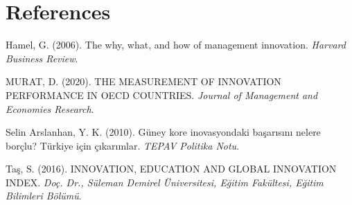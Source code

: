 \documentclass[
  12pt,
]{article}
\newlength{\cslhangindent}
\newlength{\cslentryspacingunit} %
\newenvironment{CSLReferences}[2] %
 {%
  \setlength{\parindent}{0pt}
  \ifodd #1
  \let\oldpar\par
  \def\par{\hangindent=\cslhangindent\oldpar}
  \fi
  \setlength{\parskip}{#2\cslentryspacingunit}
 }%
 {}
\begin{document}
\newpage

\hypertarget{references}{%
\section{References}\label{references}}

\hypertarget{refs}{}
\begin{CSLReferences}{1}{0}
\leavevmode{}%
Hamel, G. (2006). The why, what, and how of management innovation. \emph{Harvard Business Review}.

\leavevmode{}%
MURAT, D. (2020). THE MEASUREMENT OF INNOVATION PERFORMANCE IN OECD COUNTRIES. \emph{Journal of Management and Economies Research}.

\leavevmode{}%
Selin Arslanhan, Y. K. (2010). Güney kore inovasyondaki başarısını nelere borçlu? Türkiye için çıkarımlar. \emph{TEPAV Politika Notu}.

\leavevmode{}%
Taş, S. (2016). INNOVATION, EDUCATION AND GLOBAL INNOVATION INDEX. \emph{Doç. Dr., Süleman Demirel Üniversitesi, Eğitim Fakültesi, Eğitim Bilimleri Bölümü}.

\end{CSLReferences}
\end{document}

